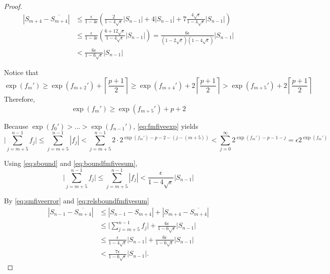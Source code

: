 \begin{proof}
      \begin{align}
      \left|S_{m+4} - \overline{S_{m+4}}\right|
          & \leq \frac{\epsilon}{1-4\epsilon}
              \left(
                  \frac{2}{1-4\sqrt{\epsilon}} |S_{n-1}|
                  + 4 |S_{n-1}|
                  + 7 \frac{4\sqrt{\epsilon}}{1-4\sqrt{\epsilon}} |S_{n-1}|
              \right) \nonumber \\
          & \leq \frac{\epsilon}{1-4\epsilon} \left(\frac{6+12\sqrt{\epsilon}}{1-4\sqrt{\epsilon}} |S_{n-1}|\right)
              = \frac{6\epsilon }{(1-2\sqrt{\epsilon})(1-4\sqrt{\epsilon})} |S_{n-1}| \nonumber \\
          & < \frac{6\epsilon}{1-6\sqrt{\epsilon}} |S_{n-1}|
          \label{eq:smfiveerror}
      \end{align}

      Notice that
      \begin{equation*}
        \exp(f_m') \geq \exp(f_{m + 2}') + \left\lceil\frac{p+ 1}{2}\right\rceil \geq \exp(f_{m + 4}') + 2  \left\lceil\frac{p + 1}{2}\right\rceil > \exp(f_{m + 5}')+ 2  \left\lceil\frac{p+ 1}{2}\right\rceil
      \end{equation*}
      Therefore,
      \begin{equation}
        \exp(f_m') \geq \exp(f_{m + 5}') + p + 2
        \label{eq:fmfiveexp}
      \end{equation}

      Because $\exp(f_0') > ... > \exp(f_{n - 1}')$, \eqref{eq:fmfiveexp} yields
      \begin{equation}
        \bigl|\sum\limits_{j = m + 5}^{n - 1} f_j\bigr| \leq \sum\limits_{j = m + 5}^{n - 1} |f_j| < \sum\limits_{j = m + 5}^{n - 1} 2 \cdot 2^{\exp(f_m') - p - 2 - (j - (m + 5))} < \sum\limits_{j = 0}^{\infty} 2^{\exp(f_m') - p - 1 - j} = \epsilon 2^{\exp(f_m')}
        \label{eq:boundfmfivesum}
      \end{equation}

      Using \eqref{eq:sbound} and \eqref{eq:boundfmfivesum},
      \begin{equation}
        \bigl|\sum\limits_{j = m + 5}^{n - 1} f_j\bigr| \leq \sum\limits_{j = m + 5}^{n - 1} |f_j| < \frac{\epsilon}{1 - 4  \sqrt\epsilon}|S_{n - 1}|
        \label{eq:relsboundfmfivesum}
      \end{equation}

      By \eqref{eq:smfiveerror} and \eqref{eq:relsboundfmfivesum}
      \begin{align}
        \left|S_{n-1} - \overline{S_{m+4}}\right|
        & \leq |S_{n-1} - S_{m+4}| + \left|S_{m+4} - \overline{S_{m+4}}\right| \nonumber \\
        & \leq \bigl|\sum_{j=m+5}^{n-1} f_j\bigr| + \frac{6\epsilon}{1-6\sqrt{\epsilon}} |S_{n-1}| \nonumber \\
        & \leq \frac{\epsilon}{1 - 4 \sqrt\epsilon}|S_{n-1}| + \frac{6\epsilon}{1-6\sqrt{\epsilon}} |S_{n-1}| \nonumber \\
        & <  \frac{7\epsilon}{1-6\sqrt{\epsilon}} |S_{n-1}|.
        \label{eq:smfiveerror-1}
      \end{align}


\end{proof}
